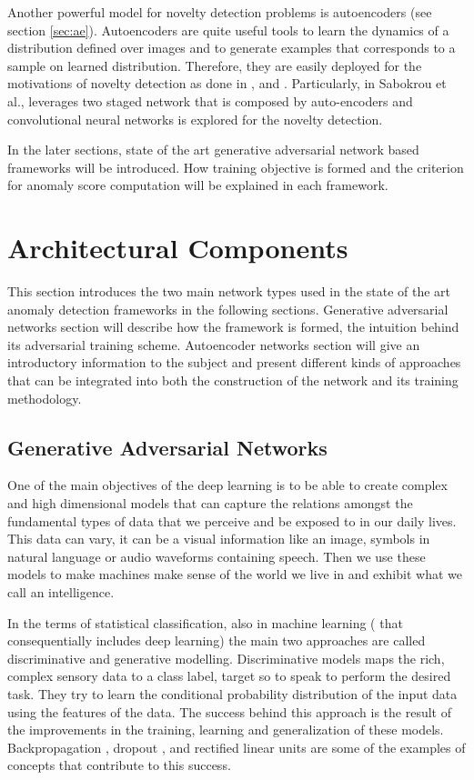 Another powerful model for novelty detection problems is autoencoders (see section \ref{sec:ae}). Autoencoders are quite useful 
tools to learn the dynamics of a distribution defined over images and to generate examples that corresponds 
to a sample on learned distribution. Therefore, they are easily deployed for the motivations of novelty 
detection as done in \cite{an2015variational}, \cite{leveau2017adversarial} and
\cite{Pidhorskyi:2018:GPN:3327757.3327787}. Particularly, in Sabokrou et al.\cite{sabokrou2018adversarially},
leverages two staged network that is composed by auto-encoders and convolutional neural networks is explored for
the novelty detection. 

In the later sections, state of the art generative adversarial network based frameworks  will be 
introduced. How training objective is formed and the criterion for anomaly score computation will 
be explained in each framework.

\section{Architectural Components}
\label{sec:arch_comp}
This section introduces the two main network types used in the state of the art anomaly detection
frameworks in the following sections. Generative adversarial networks section will describe how the
framework is formed, the intuition behind its adversarial training scheme. Autoencoder networks
section will give an introductory information to the subject and present different kinds of
approaches that can be integrated into both the construction of the network and its training
methodology. 

\subsection{Generative Adversarial Networks}
\label{sec:gan}

One of the main objectives of the deep learning is to be able to create complex and high dimensional
models that can capture the relations amongst the fundamental types of data that we perceive and be
exposed to in our daily lives. This data can vary, it can be a visual information like an image,
symbols in natural language or audio waveforms containing speech. Then we use these models to make
machines make sense of the world we live in and exhibit what we call an intelligence.
\cite{Bengio:2009:LDA:1658423.1658424}


In the terms of statistical classification, also in machine learning ( that consequentially includes
deep learning) the main two approaches are called discriminative and generative modelling.
Discriminative models maps the rich, complex sensory data to a class label, target so to speak to
perform the desired task. They try to learn the conditional probability distribution of the input
data using the features of the data. The success behind this approach is the result of the
improvements in the training, learning and generalization of these models. Backpropagation
\cite{Widrow2008AppendixGT}, dropout \cite{Srivastava2014DropoutAS}, and rectified linear
units\cite{Glorot2011DeepSR} are some of the examples of concepts that contribute to this success.

